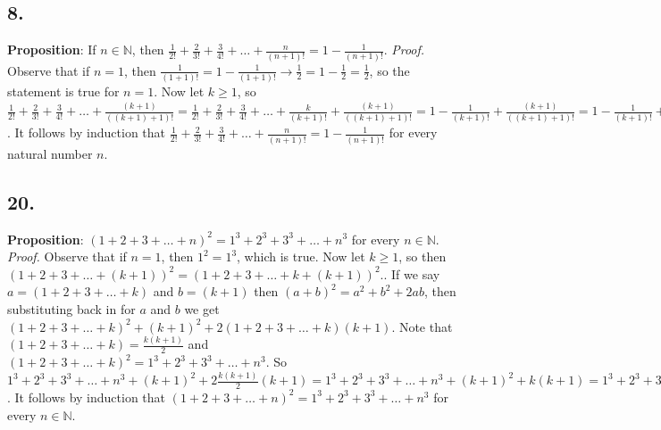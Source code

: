 \documentclass[12pt]{article}
\begin{document}
	\begin{minipage}[t]{0.40\textwidth}
		
		\subsection*{8.}
		\textbf{Proposition}: If $ n\in\mathbb{N} $, then $ \frac{1}{2!}+\frac{2}{3!}+\frac{3}{4!}+\dots+\frac{n}{(n+1)!}=1-\frac{1}{(n+1)!}$.
		\newline\textit{Proof.} Observe that if $ n=1 $, then $ \frac{1}{(1+1)!}=1-\frac{1}{(1+1)!}\rightarrow \frac{1}{2}=1-\frac{1}{2}=\frac{1}{2} $, so the statement is true for $ n=1 $. Now let $ k\geq 1 $, so $ \frac{1}{2!}+\frac{2}{3!}+\frac{3}{4!}+\dots+\frac{(k+1)}{((k+1)+1)!} = \frac{1}{2!}+\frac{2}{3!}+\frac{3}{4!}+\dots+\frac{k}{(k+1)!}+\frac{(k+1)}{((k+1)+1)!} = 1-\frac{1}{(k+1)!} + \frac{(k+1)}{((k+1)+1)!} = 1-\frac{1}{(k+1)!} + \frac{(k+1)}{(k+2)!} = 1-(\frac{1}{(k+1)!} - \frac{(k+1)}{(k+2)!}) = 1-(\frac{1}{(k+1)!} - \frac{(k+1)}{(k+2)(k+1)!}) = 1-\frac{k+1-(k+1)}{(k+2)(k+1)!} = 1-\frac{1}{(k+2)(k+1)!} = 1-\frac{1}{(k+2)!} =  1-\frac{1}{((k+1)+1)!} $. It follows by induction that $ \frac{1}{2!}+\frac{2}{3!}+\frac{3}{4!}+\dots+\frac{n}{(n+1)!}=1-\frac{1}{(n+1)!}$ for every natural number $ n $.
		
		\subsection*{20.}
		\textbf{Proposition}: $ (1+2+3+\dots+n)^2=1^3+2^3+3^3+\dots+n^3 $ for every $ n\in\mathbb{N} $.
		\newline\textit{Proof.} Observe that if $ n=1 $, then $ 1^2=1^3 $, which is true. Now let $ k\geq1 $, so then $ (1+2+3+\dots+(k+1))^2 = (1+2+3+\dots+k+(k+1))^2. $. If we say $ a=(1+2+3+\dots+k) $ and $ b=(k+1) $ then $ (a+b)^2 = a^2+b^2+2ab $, then substituting back in for $ a $ and $ b $ we get $ (1+2+3+\dots+k)^2 + (k+1)^2+2(1+2+3+\dots+k)(k+1)$. Note that $ (1+2+3+\dots+k) = \frac{k(k+1)}{2} $ and $ (1+2+3+\dots+k)^2 = 1^3+2^3+3^3+\dots+n^3 $. So $ 1^3+2^3+3^3+\dots+n^3 + (k+1)^2+2\frac{k(k+1)}{2}(k+1) = 1^3+2^3+3^3+\dots+n^3 + (k+1)^2+k(k+1) = 1^3+2^3+3^3+\dots+n^3 + (k+1)^2(k+1) = 1^3+2^3+3^3+\dots+n^3 + (k+1)^3 $. It follows by induction that $ (1+2+3+\dots+n)^2=1^3+2^3+3^3+\dots+n^3 $ for every $ n\in\mathbb{N} $.
		
		
	\end{minipage}
	\hfill\vline\hfill
\end{document}
